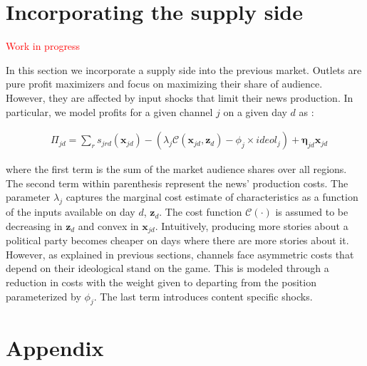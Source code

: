 \documentclass[12pt]{article}
\begin{document}
\section{Incorporating the supply side}

\label{section:supply}


\textcolor{red}{Work in progress}

In this section we incorporate a supply side into the previous market. Outlets are pure profit maximizers and focus on maximizing their share of audience. However, they are affected by input shocks that limit their news production. In particular, we model profits for a given channel $j$ on a given day $d$ as :

\begin{equation}\label{}
	\begin{aligned}
		& \Pi_{jd }= \sum_{r}s_{jrd}(\bm{x}_{jd}) - \left( \lambda_j\mathcal{C}(\bm{x}_{jd}, \bm{z}_d) -\phi_j  \times ideol_j\right)+ \bm{\eta}_{jd}\bm{x}_{jd}
	\end{aligned}
\end{equation} 

where the first term is the sum of the market audience shares over all regions. The second term within parenthesis represent the news' production costs.  The parameter $\lambda_j$ captures the marginal cost estimate of characteristics as a function of the inputs available  on day $d$,  $\bm{z}_d$. The cost function $\mathcal{C}(\cdot)$ is assumed to be decreasing in   $\bm{z}_d$   and convex in $\bm{x}_{jd}$. Intuitively, producing more stories about a political party becomes cheaper on days where there are more stories about it. However, as explained in previous sections, channels face asymmetric costs that depend on their ideological stand on the game. This is modeled through a reduction in costs with the weight given to departing from the position parameterized by $\phi_j$. The last term introduces content specific shocks. 










\clearpage

\section{Appendix}
\end{document}
